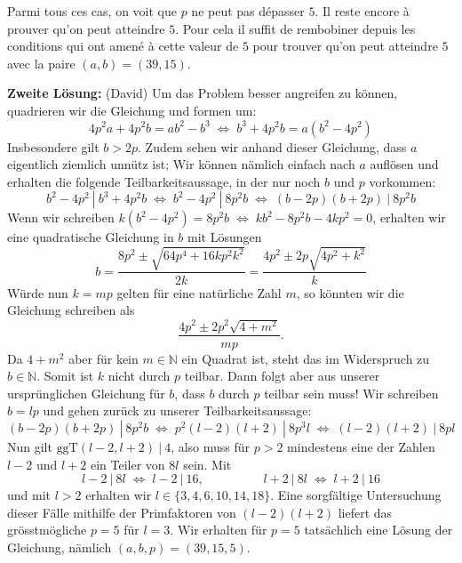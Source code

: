 Parmi tous ces cas, on voit que $p$ ne peut pas dépasser $5$. Il reste encore à prouver qu'on peut atteindre $5$. Pour cela il suffit de rembobiner depuis les conditions qui ont amené à cette valeur de $5$ pour trouver qu'on peut atteindre $5$ avec la paire $(a, b) = (39, 15)$.

\textbf{Zweite Lösung:} (David) Um das Problem besser angreifen zu können, quadrieren wir die Gleichung und formen um:
\[
4p^2a + 4p^2b = ab^2 - b^3 \; \Longleftrightarrow \; b^3 + 4p^2b = a(b^2 - 4p^2)
\]
Insbesondere gilt $b > 2p$. Zudem sehen wir anhand dieser Gleichung, dass $a$ eigentlich ziemlich unnütz ist; Wir können nämlich einfach nach $a$ auflösen und erhalten die folgende Teilbarkeitsaussage, in der nur noch $b$ und $p$ vorkommen:
\[
b^2-4p^2 \ | \ b^3 + 4p^2b \; \Longleftrightarrow \; b^2 - 4p^2 \ | \ 8p^2b \; \Longleftrightarrow \; (b-2p)(b+2p) \ | \ 8p^2b
\]
Wenn wir schreiben $k(b^2-4p^2) = 8p^2b \; \Longleftrightarrow \; kb^2 - 8p^2b - 4kp^2 = 0$, erhalten wir eine quadratische Gleichung in $b$ mit Lösungen
\[
b = \frac{8p^2 \pm \sqrt{64p^4 + 16kp^2k^2}}{2k} = \frac{4p^2 \pm 2p\sqrt{4p^2+k^2}}{k}
\]
Würde nun $k=mp$ gelten für eine natürliche Zahl $m$, so könnten wir die Gleichung schreiben als
\[
\frac{4p^2 \pm 2p^2\sqrt{4+m^2}}{mp}.
\]
Da $4+m^2$ aber für kein $m \in \mathbb{N}$ ein Quadrat ist, steht das im Widerspruch zu $b \in \mathbb{N}$. Somit ist $k$ nicht durch $p$ teilbar. Dann folgt aber aus unserer ursprünglichen Gleichung für $b$, dass $b$ durch $p$ teilbar sein muss! Wir schreiben $b=lp$ und gehen zurück zu unserer Teilbarkeitsaussage:
\[
(b-2p)(b+2p) \ | \ 8p^2b \; \Longleftrightarrow \; p^2(l-2)(l+2) \ | \ 8p^3l \; \Longleftrightarrow \; (l-2)(l+2) \ | \ 8pl
\]
Nun gilt $\text{ggT}(l-2,l+2) \ | \ 4$, also muss für $p>2$ mindestens eine der Zahlen $l-2$ und $l+2$ ein Teiler von $8l$ sein. Mit 
\[
l-2 \ | \ 8l \; \Longleftrightarrow \; l-2 \ | \ 16, \hspace{2cm} l+2 \ | \ 8l \; \Longleftrightarrow \; l+2 \ | \ 16
\]
und mit $l>2$ erhalten wir $l \in \{3,4,6,10,14,18 \}$. Eine sorgfältige Untersuchung dieser Fälle mithilfe der Primfaktoren von $(l-2)(l+2)$ liefert das grösstmögliche $p=5$ für $l=3$. Wir erhalten für $p=5$ tatsächlich eine Lösung der Gleichung, nämlich $(a,b,p) = (39,15,5)$. 

